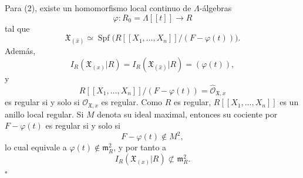 Para (2), existe un homomorfismo local continuo de $\Lambda$-álgebras
\[
\varphi:R_0=\Lambda[[t]]\longrightarrow R
\]
tal que
\[
\mathfrak X_{(\widehat x)}
\simeq\operatorname{Spf}
 \bigl(R[[X_1,\ldots,X_n]]/(F-\varphi(t))\bigr).
\]
Además,
\[
I_R(\mathfrak X_{(x)}|R)
=I_R(\mathfrak X_{(\widehat x)}|R)
=(\varphi(t)),
\]
y
\[
R[[X_1,\ldots,X_n]]/(F-\varphi(t))
=\widehat{\mathcal O}_{\mathfrak X,x}
\]
es regular si y solo si $\mathcal O_{\mathfrak X,x}$ es regular. Como
$R$ es regular, $R[[X_1,\ldots,X_n]]$ es un anillo local regular. Si
$M$ denota su ideal maximal, entonces su cociente por
$F-\varphi(t)$ es regular si y solo si
\[
F-\varphi(t)\notin M^2,
\]
lo cual equivale a $\varphi(t)\notin\mathfrak m_R^2$, y por tanto a
\[
I_R(\mathfrak X_{(x)}|R)\not\subset\mathfrak m_R^2.
\]
\hfill$\square$
